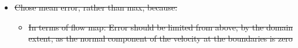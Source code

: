 \begin{framed}
\begin{itemize}
        \item \sout{Chose mean error, rather than max, because:}
                \begin{itemize}
                    \item \sout{In terms of flow map: Error should be limited from above, by the domain extent, as the normal component
                        of the velocity at the boundaries is zero}

\end{itemize}
\end{itemize}
\end{framed}
